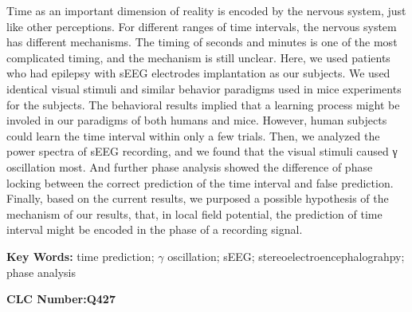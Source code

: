 Time as an important dimension of reality is encoded by the nervous system,
just like other perceptions. For different ranges of time intervals,
the nervous system has different mechanisms.
The timing of seconds and minutes is one of the most complicated timing,
and the mechanism is still unclear.
Here, we used patients who had epilepsy with sEEG electrodes implantation as our subjects.
We used identical visual stimuli and similar behavior paradigms used in mice experiments for the subjects.
The behavioral results implied that a learning process might be involed in our paradigms of both humans and mice.
However, human subjects could learn the time interval within only a few trials.
Then, we analyzed the power spectra of sEEG recording,
and we found that the visual stimuli caused γ oscillation most.
And further phase analysis showed the difference of phase locking
between the correct prediction of the time interval and false prediction.
Finally, based on the current results, we purposed a possible hypothesis of the mechanism of our results, that,
in local field potential, the prediction of time interval might be encoded in the phase of a recording signal.

\bigskip
\noindent \textbf{Key Words:\hspace{\Han}}
time prediction;\;
\(\gamma\) oscillation;\;
sEEG;\;
stereoelectroencephalograhpy;\;
phase analysis

\bigskip
\noindent \textbf{CLC Number:\hspace{\Han}Q427}
